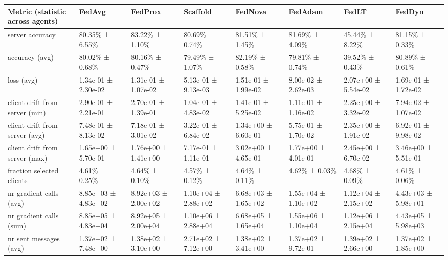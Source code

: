 \begin{tabular}{llllllll}
\hline
 Metric (statistic across agents)   & FedAvg              & FedProx             & Scaffold            & FedNova             & FedAdam             & FedLT               & FedDyn              \\
\hline
 server accuracy                    & 80.35\% ± 6.55\%      & 83.22\% ± 1.10\%      & 80.69\% ± 0.74\%      & 81.51\% ± 1.45\%      & 81.69\% ± 4.09\%      & 45.44\% ± 8.22\%      & 81.15\% ± 0.33\%      \\
 accuracy (avg)                     & 80.02\% ± 0.68\%      & 80.16\% ± 0.47\%      & 79.49\% ± 1.07\%      & 82.19\% ± 0.58\%      & 79.81\% ± 0.74\%      & 39.52\% ± 0.43\%      & 80.89\% ± 0.61\%      \\
 loss (avg)                         & 1.34e-01 ± 2.30e-02 & 1.31e-01 ± 1.07e-02 & 5.13e-01 ± 9.13e-03 & 1.51e-01 ± 1.99e-02 & 8.00e-02 ± 2.62e-03 & 2.07e+00 ± 5.54e-02 & 1.69e-01 ± 1.72e-02 \\
 client drift from server (min)     & 2.90e-01 ± 2.21e-01 & 2.70e-01 ± 1.39e-01 & 1.04e-01 ± 4.83e-02 & 1.41e-01 ± 5.25e-02 & 1.11e-01 ± 1.16e-02 & 2.25e+00 ± 3.32e-02 & 7.94e-02 ± 1.07e-02 \\
 client drift from server (avg)     & 7.48e-01 ± 8.13e-02 & 7.18e-01 ± 3.01e-02 & 3.22e-01 ± 6.84e-02 & 1.34e+00 ± 6.60e-01 & 5.75e-01 ± 1.70e-02 & 2.35e+00 ± 1.91e-02 & 6.92e-01 ± 9.98e-02 \\
 client drift from server (max)     & 1.65e+00 ± 5.70e-01 & 1.76e+00 ± 1.41e+00 & 7.17e-01 ± 1.11e-01 & 3.02e+00 ± 4.65e-01 & 1.77e+00 ± 4.01e-01 & 2.45e+00 ± 6.70e-02 & 3.46e+00 ± 5.51e-01 \\
 fraction selected clients          & 4.61\% ± 0.25\%       & 4.64\% ± 0.10\%       & 4.57\% ± 0.12\%       & 4.64\% ± 0.11\%       & 4.62\% ± 0.03\%       & 4.68\% ± 0.09\%       & 4.61\% ± 0.06\%       \\
 nr gradient calls (avg)            & 8.85e+03 ± 4.83e+02 & 8.92e+03 ± 2.00e+02 & 1.10e+04 ± 2.88e+02 & 6.68e+03 ± 1.65e+02 & 1.55e+04 ± 1.10e+02 & 1.12e+04 ± 2.15e+02 & 4.43e+03 ± 5.98e+01 \\
 nr gradient calls (sum)            & 8.85e+05 ± 4.83e+04 & 8.92e+05 ± 2.00e+04 & 1.10e+06 ± 2.88e+04 & 6.68e+05 ± 1.65e+04 & 1.55e+06 ± 1.10e+04 & 1.12e+06 ± 2.15e+04 & 4.43e+05 ± 5.98e+03 \\
 nr sent messages (avg)             & 1.37e+02 ± 7.48e+00 & 1.38e+02 ± 3.10e+00 & 2.71e+02 ± 7.12e+00 & 1.38e+02 ± 3.41e+00 & 1.37e+02 ± 9.72e-01 & 1.39e+02 ± 2.66e+00 & 1.37e+02 ± 1.85e+00 \\

\end{tabular}
